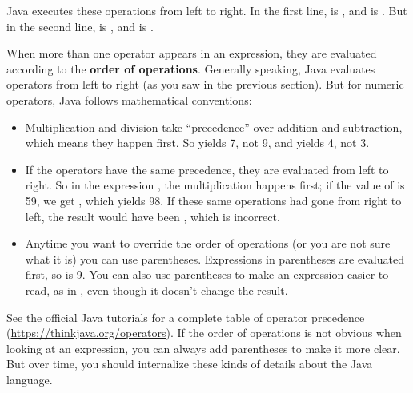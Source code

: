 Java executes these operations from left to right.
In the first line,  is , and  is .
But in the second line,  is , and  is .




When more than one operator appears in an expression, they are evaluated according to the {\bf order of operations}.
Generally speaking, Java evaluates operators from left to right (as you saw in the previous section).
But for numeric operators, Java follows mathematical conventions:

\begin{itemize}

\item Multiplication and division take ``precedence'' over addition and subtraction, which means they happen first.
So  yields 7, not 9, and  yields 4, not 3.

\item If the operators have the same precedence, they are evaluated from left to right.
So in the expression , the multiplication happens first; if the value of  is 59, we get , which yields 98.
If these same operations had gone from right to left, the result would have been , which is incorrect.


\item Anytime you want to override the order of operations (or you are not sure what it is) you can use parentheses.
Expressions in parentheses are evaluated first, so  is 9.
You can also use parentheses to make an expression easier to read, as in , even though it doesn't change the result.

\end{itemize}

See the official Java tutorials for a complete table of operator precedence (\url{https://thinkjava.org/operators}).
If the order of operations is not obvious when looking at an expression, you can always add parentheses to make it more clear.
But over time, you should internalize these kinds of details about the Java language.


